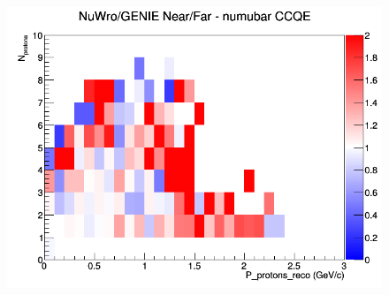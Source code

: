\documentclass[12pt]{article}
\begin{document}
\begin{figure}[h]
\endminipage
{}
\includegraphics[width=\linewidth]{eff_N_P/LAr/protons/ratios/CCQE_NuWro_GENIE_numubar_NF_N_P.png}
\endminipage
\newline
\end{figure}
\clearpage
\end{document}
